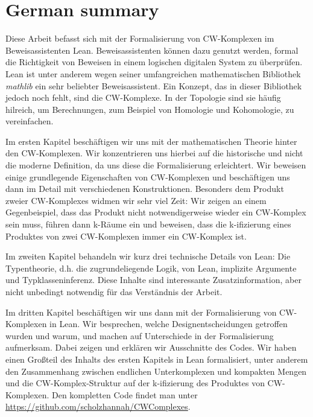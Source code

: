 \chapter*{German summary}

Diese Arbeit befasst sich mit der Formalisierung von CW-Komplexen im Beweisassistenten Lean. 
Beweisassistenten können dazu genutzt werden, formal die Richtigkeit von Beweisen in einem logischen digitalen System zu überprüfen. 
Lean ist unter anderem wegen seiner umfangreichen mathematischen Bibliothek \emph{mathlib} ein sehr beliebter Beweisassistent. 
Ein Konzept, das in dieser Bibliothek jedoch noch fehlt, sind die CW-Komplexe. 
In der Topologie sind sie häufig hilreich, um Berechnungen, zum Beispiel von Homologie und Kohomologie, zu vereinfachen. 

Im ersten Kapitel beschäftigen wir uns mit der mathematischen Theorie hinter den CW-Komplexen. 
Wir konzentrieren uns hierbei auf die historische und nicht die moderne Definition, da uns diese die Formalisierung erleichtert. 
Wir beweisen einige grundlegende Eigenschaften von CW-Komplexen und beschäftigen uns dann im Detail mit verschiedenen Konstruktionen. 
Besonders dem Produkt zweier CW-Komplexes widmen wir sehr viel Zeit: Wir zeigen an einem Gegenbeispiel, dass das Produkt nicht notwendigerweise wieder ein CW-Komplex sein muss, führen dann k-Räume ein und beweisen, dass die k-ifizierung eines Produktes von zwei CW-Komplexen immer ein CW-Komplex ist.

Im zweiten Kapitel behandeln wir kurz drei technische Details von Lean: Die Typentheorie, d.h. die zugrundeliegende Logik, von Lean, implizite Argumente und Typklasseninferenz.
Diese Inhalte sind interessante Zusatzinformation, aber nicht unbedingt notwendig für das Verständnis der Arbeit. 

Im dritten Kapitel beschäftigen wir uns dann mit der Formalisierung von CW-Komplexen in Lean. 
Wir besprechen, welche Designentscheidungen getroffen wurden und warum, und machen auf Unterschiede in der Formalisierung aufmerksam. 
Dabei zeigen und erklären wir Ausschnitte des Codes. 
Wir haben einen Großteil des Inhalts des ersten Kapitels in Lean formalisiert, unter anderem den Zusammenhang zwischen endlichen Unterkomplexen und kompakten Mengen und die CW-Komplex-Struktur auf der k-ifizierung des Produktes von CW-Komplexen.
Den kompletten Code findet man unter \url{https://github.com/scholzhannah/CWComplexes}.